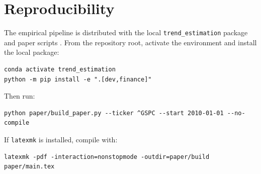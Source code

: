 \section{Reproducibility}
The empirical pipeline is distributed with the local \texttt{trend\_estimation}
package and paper scripts \citep{trendestimation}. From the repository root,
activate the environment and install the local package:
\begin{verbatim}
conda activate trend_estimation
python -m pip install -e ".[dev,finance]"
\end{verbatim}
Then run:
\begin{verbatim}
python paper/build_paper.py --ticker ^GSPC --start 2010-01-01 --no-compile
\end{verbatim}
If \texttt{latexmk} is installed, compile with:
\begin{verbatim}
latexmk -pdf -interaction=nonstopmode -outdir=paper/build paper/main.tex
\end{verbatim}
